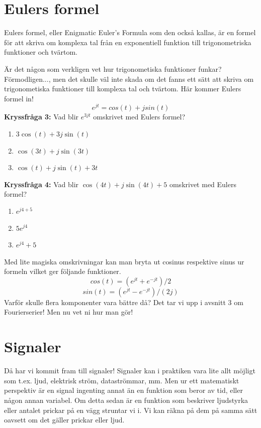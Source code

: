 \documentclass{article}
\begin{document}
\section{Eulers formel}
Eulers formel, eller Enigmatic Euler's Formula som den också kallas,
är en formel för att skriva om komplexa tal från en exponentiell funktion
till trigonometriska funktioner och tvärtom.

Är det någon som verkligen vet hur trigonometiska funktioner funkar?
Förmodligen..., men det skulle väl inte skada om det fanns ett sätt att skriva
om trigonometiska funktioner till komplexa tal och tvärtom. Här kommer Eulers formel in!
$$e^{jt} = cos(t) + jsin(t) $$
\textbf{Kryssfråga 3:} Vad blir $e^{3jt}$ omskrivet med Eulers formel?
\begin{enumerate}[label={\alph*)},font={\bfseries}]
\item $3 \cos(t) + 3 j \sin(t)$
\item $\cos(3t) + j \sin(3t)$
\item $\cos(t) + j \sin(t) + 3 t$
\end{enumerate}

\textbf{Kryssfråga 4:} Vad blir $\cos(4t)+j \sin(4t)+5$ omskrivet med Eulers formel?
\begin{enumerate}[label={\alph*)},font={\bfseries}]
\item $e^{j4+5}$
\item $5e^{j4}$
\item $e^{j4} + 5$
\end{enumerate}

Med lite magiska omskrivningar kan man bryta ut cosinus respektive sinus ur formeln
vilket ger följande funktioner.
$$cos(t) = (e^{jt} + e^{-jt})/2 $$
$$sin(t) = (e^{jt} - e^{-jt})/(2j) $$
Varför skulle flera komponenter vara bättre då? Det tar vi upp i avsnitt 3
om Fourierserier! Men nu vet ni hur man gör!

\section{Signaler}

Då har vi kommit fram till signaler! Signaler kan i praktiken vara lite allt
möjligt som t.ex. ljud, elektrisk ström, dataströmmar, mm. Men ur ett
matematiskt perspektiv är en signal ingenting annat än en funktion som beror
av tid, eller någon annan variabel. Om detta sedan är en funktion som
beskriver ljudstyrka eller antalet prickar på en vägg struntar vi i. Vi kan
räkna på dem på samma sätt oavsett om det gäller prickar eller ljud.
\end{document}
